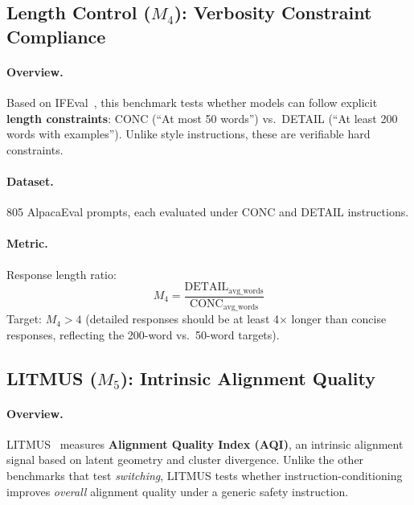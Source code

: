 \subsection{Length Control ($M_4$): Verbosity Constraint Compliance}
\label{sec:appendix_length_control}

\paragraph{Overview.} Based on IFEval~\cite{zhou2023ifeval}, this benchmark tests whether models can follow explicit \textbf{length constraints}: CONC (``At most 50 words'') vs.\ DETAIL (``At least 200 words with examples''). Unlike style instructions, these are verifiable hard constraints.

\paragraph{Dataset.} 805 AlpacaEval prompts, each evaluated under CONC and DETAIL instructions.

\paragraph{Metric.} Response length ratio:
\begin{equation*}
    M_4 = \frac{\text{DETAIL}_{\text{avg\_words}}}{\text{CONC}_{\text{avg\_words}}}
\end{equation*}
Target: $M_4 > 4$ (detailed responses should be at least 4$\times$ longer than concise responses, reflecting the 200-word vs.\ 50-word targets).

\subsection{LITMUS ($M_5$): Intrinsic Alignment Quality}
\label{sec:appendix_litmus}

\paragraph{Overview.} LITMUS~\cite{borah-etal-2025-alignment} measures \textbf{Alignment Quality Index (AQI)}, an intrinsic alignment signal based on latent geometry and cluster divergence. Unlike the other benchmarks that test \emph{switching}, LITMUS tests whether instruction-conditioning improves \emph{overall} alignment quality under a generic safety instruction.

